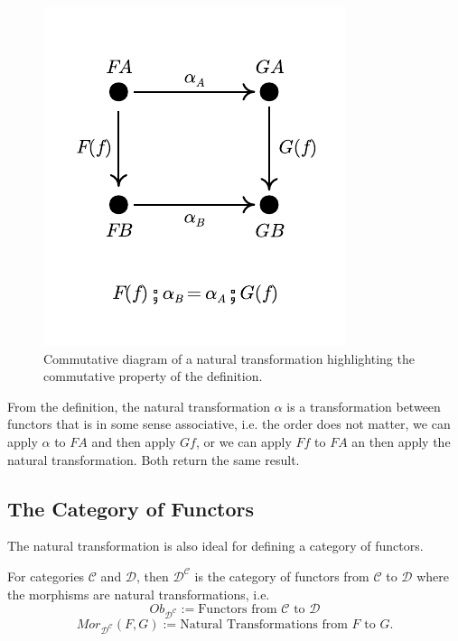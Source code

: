\begin{figure}[H]
  \begin{center}
    \includegraphics{./notebooks/NaturalTransformation.pdf}
  \end{center}
  \caption{Commutative diagram of a natural transformation highlighting the commutative property of the definition.}
  \label{fig:NaturalTransformation}
\end{figure}

From the definition, the natural transformation $\alpha$ is a transformation between functors
that is in some sense associative, i.e. the order does not matter, we can apply $\alpha$
to $FA$ and then apply $Gf$, or we can apply $Ff$ to $FA$ an then apply the natural transformation. Both
return the same result.

\subsection{The Category of Functors}

The natural transformation is also ideal for defining a category of functors.

\begin{definition}
  For categories $\mathcal C$ and $\mathcal D$, then $\mathcal D^{\mathcal C}$ is the category
  of functors from $\mathcal C$ to $\mathcal D$ where the morphisms are natural transformations,
  i.e.
  \begin{displaymath}
    Ob_{\mathcal D^{\mathcal C}} :={\text{Functors from } \mathcal C \text{ to } \mathcal D}
  \end{displaymath}
  \begin{displaymath}
    Mor_{\mathcal D^{\mathcal C}}(F,G) :={\text{Natural Transformations from } 
    F \text{ to } G}.
  \end{displaymath}
\end{definition}

